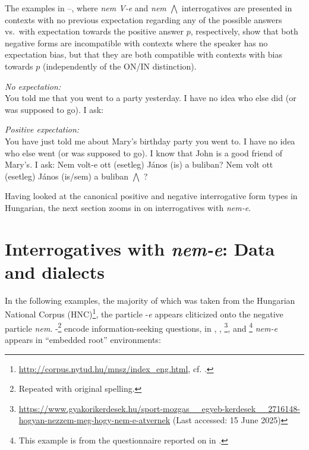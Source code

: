 \documentclass[output=paper,colorlinks,citecolor=brown]{langscibook}
\begin{document}
	The  examples in --, where  \textit{nem V-e} and \textit{nem  $\bigwedge$} interrogatives are presented in contexts with no previous expectation regarding any of the possible answers vs.~with expectation towards the positive answer $p$, respectively, show that both  negative forms are incompatible with contexts where the speaker has no  expectation bias, but that they are both compatible with contexts with bias towards $p$ (independently of the ON/IN distinction).
	
	
	\ea\label{ex:neut-exp}
	\textit{No expectation:}\\
	You told me that you went to a party yesterday. I have no idea who else did (or was supposed to go). I ask:
	\z
	\z
	
	
	\ea\label{ex:pos-exp}
	\textit{Positive expectation:}\\
	You have just told me about Mary's birthday party you went to. I have  no idea who else went (or was supposed to go). I know that John is a good friend of Mary's. I ask:
	\ea Nem volt-e ott (esetleg) János (is) a buliban?
	\ex Nem  volt ott (esetleg) János (is/sem) a buliban $\bigwedge$ ?
	\z
	\z
	
	Having looked at the canonical positive and negative interrogative form types in Hungarian, the next section zooms in on interrogatives with \textit{nem-e}.
	
	
\section{Interrogatives with \textit{nem-e}: Data and dialects}\label{sect:dialects}
	
	In the following examples, the majority of which was taken from the Hungarian National Corpus (HNC)\footnote{\url{http://corpus.nytud.hu/mnsz/index\_eng.html}, cf. \citet{oraveczetal2014}.},  the particle \nobreakdash-\textit{e}  appears cliticized onto the negative particle \textit{nem}.  -\footnote{Repeated with original spelling.} encode information-seeking questions, in , ,  \footnote{\url{https://www.gyakorikerdesek.hu/sport-mozgas__egyeb-kerdesek__2716148-hogyan-nezzem-meg-hogy-nem-e-atvernek} (Last accessed: 15 June 2025)},  and 
	\footnote{This example is from the questionnaire reported on in \citet{kassai1994}.} \textit{nem-e} appears in ``embedded root'' environments:
	
\end{document}
